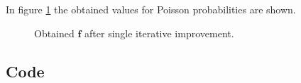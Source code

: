 In figure \ref{fig:3c_P} the obtained values for Poisson probabilities are shown.

\begin{figure}[!ht]
  \centering
  
  \caption{Obtained $\mathbf{f}$ after single iterative improvement.}
  \label{fig:3c_P}
\end{figure}

\pagebreak

\subsection*{Code}


\newpage